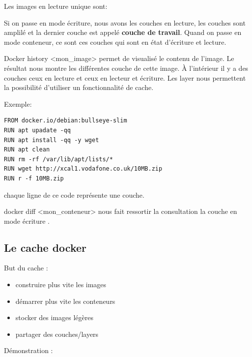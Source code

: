 \documentclass[12pt,a4paper]{article}
\begin{document}
Les images en lecture unique sont:

Si on passe en mode écriture, nous avons les couches en lecture, les couches sont amplilé et la dernier couche est appelé \textbf{couche de travail}. Quand on passe en mode conteneur, ce sont ces couches qui sont en état d'écriture et lecture.

Docker history <mon\_image> permet de visualisé le contenu de l'image. Le résultat nous montre les différentes couche de cette image. À l'intérieur il y a des couches ceux en lecture et ceux en lecteur et écriture. 
Les layer nous permettent la possibilité d'utiliser un fonctionnalité de cache.

Exemple: 

\begin{verbatim}
FROM docker.io/debian:bullseye-slim
RUN apt upadate -qq
RUN apt install -qq -y wget
RUN apt clean
RUN rm -rf /var/lib/apt/lists/*
RUN wget http://xcal1.vodafone.co.uk/10MB.zip
RUN r -f 10MB.zip
\end{verbatim}

chaque ligne de ce code représente une couche.


docker diff <mon\_conteneur> nous fait ressortir la consultation la couche en mode écriture .



\subsection{Le cache docker}
But du cache : 
\begin{itemize}
\item construire plus vite les images
\item démarrer plus vite les conteneurs
\item stocker des images légères
\item partager des couches/layers
\end{itemize}
Démonstration : \\
\end{document}
